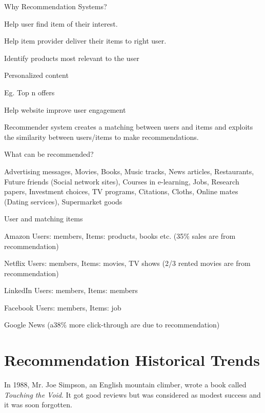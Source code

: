 	\begin{bulletedlist}
		\item Why Recommendation Systems?
		\begin{bulletedlist}
			\item Help user find item of their interest.
			\item Help item provider deliver their items to right user.
			\begin{bulletedlist}
				\item Identify products most relevant to the user
				\item Personalized content
				\item Eg. Top n offers
			\end{bulletedlist}
			\item Help website improve user engagement
		\end{bulletedlist}
		\item Recommender system creates a matching between users and items and exploits the similarity between users/items to make recommendations.
		\item What can be recommended?
		\begin{bulletedlist}
			\item Advertising messages, Movies, Books, Music tracks, News articles, Restaurants, Future friends (Social network sites), Courses in e-learning, Jobs, Research papers, Investment choices, TV programs, Citations, Cloths, Online mates (Dating services), Supermarket goods
		\end{bulletedlist}
		\item User and matching items
		\begin{bulletedlist}
			\item Amazon Users: members, Items: products, books etc. (35\% sales are from recommendation)
			\item Netflix Users: members, Items: movies, TV shows (2/3 rented movies are from recommendation)
			\item LinkedIn Users: members, Items: members
			\item Facebook Users: members, Items: job
			\item Google News (a38\% more click-through are due to recommendation)
		\end{bulletedlist}
	\end{bulletedlist}

	\section{Recommendation Historical Trends}
In 1988, Mr. Joe Simpson, an English mountain climber, wrote a book called \textit{Touching the Void}.  It got good reviews but was considered as modest success and it was soon forgotten.

